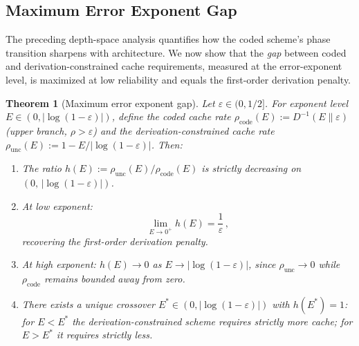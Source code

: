 \documentclass[journal]{IEEEtran}
\newtheorem{theorem}{Theorem}[section]
\numberwithin{equation}{section}
\begin{document}
\subsection{Maximum Error Exponent Gap}
\label{subsec:max-gap-ds}

The preceding depth-space analysis quantifies how the coded
scheme's phase transition sharpens with architecture.
We now show that the \emph{gap} between coded and
derivation-constrained cache requirements, measured at the
error-exponent level, is maximized at low reliability and equals
the first-order derivation penalty.

\begin{theorem}[Maximum error exponent gap]
\label{thm:max-gap-ds}
Let $\varepsilon\in(0,1/2]$.
For exponent level $E\in(0,|\!\log(1{-}\varepsilon)|)$,
define the coded cache rate
$\rho_{\mathrm{code}}(E):=D^{-1}(E\|\varepsilon)$
\textup{(}upper branch, $\rho>\varepsilon$\textup{)} and
the derivation-constrained cache rate
$\rho_{\mathrm{unc}}(E):=1{-}E/|\!\log(1{-}\varepsilon)|$.
Then:
\begin{enumerate}[label=\textup{(\Roman*)}]
\item The ratio
$h(E):=\rho_{\mathrm{unc}}(E)/\rho_{\mathrm{code}}(E)$
is strictly decreasing on
$(0,\,|\!\log(1{-}\varepsilon)|)$.

\item At low exponent:
\begin{equation}\label{eq:max-ratio-ds}
  \lim_{E\to 0^+}h(E)=\frac{1}{\varepsilon}\,,
\end{equation}
recovering the first-order derivation penalty.

\item At high exponent:
$h(E)\to 0$ as
$E\to|\!\log(1{-}\varepsilon)|$,
since $\rho_{\mathrm{unc}}\to 0$ while
$\rho_{\mathrm{code}}$ remains bounded away from
zero.

\item There exists a unique crossover
$E^*\in(0,|\!\log(1{-}\varepsilon)|)$ with
$h(E^*)=1$: for $E<E^*$ the
derivation-constrained scheme requires strictly more
cache; for $E>E^*$ it requires strictly less.
\end{enumerate}
\end{theorem}
\end{document}
